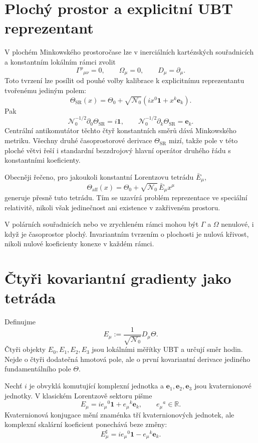 \section{Plochý prostor a explicitní UBT reprezentant}
V plochém Minkowského prostoročase lze v inerciálních kartézských
souřadnicích a konstantním lokálním rámci zvolit
\[
 \Gamma^\rho{}_{\mu\nu}=0,
 \qquad \Omega_\mu=0,
 \qquad D_\mu=\partial_\mu.
\]
Toto tvrzení lze posílit od pouhé volby kalibrace k explicitnímu
reprezentantu tvořenému jediným polem:
\[
 \boxed{
 \Theta_{\mathrm{SR}}(x)=\Theta_0+\sqrt{\mathcal N_0}
 \left(i x^0\mathbf1+x^k\mathbf e_k\right).}
\]
Pak
\[
 \mathcal N_0^{-1/2}\partial_0\Theta_{\mathrm{SR}}=i\mathbf1,
 \qquad
 \mathcal N_0^{-1/2}\partial_k\Theta_{\mathrm{SR}}=\mathbf e_k.
\]
Centrální antikomutátor těchto čtyř konstantních směrů dává
Minkowského metriku. Všechny druhé časoprostorové derivace
$\Theta_{\mathrm{SR}}$ mizí, takže pole v této ploché větvi řeší i
standardní bezzdrojový hlavní operátor druhého řádu s konstantními
koeficienty.

Obecněji řečeno, pro jakoukoli konstantní Lorentzovu tetrádu $\bar E_\mu$,
\[
 \Theta_{\mathrm{aff}}(x)=\Theta_0+
 \sqrt{\mathcal N_0}\,\bar E_\mu x^\mu
\]
generuje přesně tuto tetrádu. Tím se uzavírá problém reprezentace ve
speciální relativitě, nikoli však jedinečnost ani existence v zakřiveném
prostoru.

V polárních souřadnicích nebo ve zrychleném rámci mohou být $\Gamma$ a
$\Omega$ nenulové, i když je časoprostor plochý. Invariantním tvrzením o
plochosti je nulová křivost, nikoli nulové koeficienty konexe v každém rámci.

\section{Čtyři kovariantní gradienty jako tetráda}
Definujme
\[
 E_\mu:=\frac{1}{\sqrt{\mathcal N_0}}D_\mu\Theta.
\]
Čtyři objekty $E_0,E_1,E_2,E_3$ jsou lokálními měřítky UBT a určují
směr hodin. Nejde o čtyři dodatečná hmotová pole, ale o první kovariantní
derivace jediného fundamentálního pole $\Theta$.

Nechť $i$ je obvyklá komutující komplexní jednotka a
$\mathbf e_1,\mathbf e_2,\mathbf e_3$ jsou kvaternionové jednotky. V klasickém
Lorentzově sektoru pišme
\[
 E_\mu=i e_\mu{}^0\mathbf1+e_\mu{}^k\mathbf e_k,
 \qquad e_\mu{}^a\in\mathbb R.
\]
Kvaternionová konjugace mění znaménka tří kvaternionových jednotek, ale
komplexní skalární koeficient ponechává beze změny:
\[
 E_\mu^\sharp=i e_\mu{}^0\mathbf1-e_\mu{}^k\mathbf e_k.
\]

